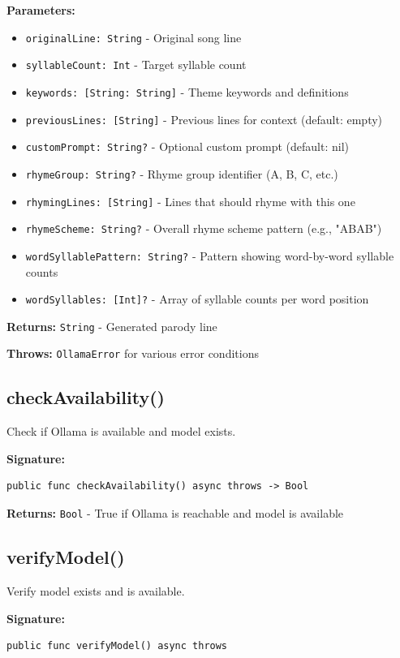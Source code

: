 \documentclass[11pt,a4paper]{article}
\begin{document}
\textbf{Parameters:}
\begin{itemize}
    \item \texttt{originalLine: String} - Original song line
    \item \texttt{syllableCount: Int} - Target syllable count
    \item \texttt{keywords: [String: String]} - Theme keywords and definitions
    \item \texttt{previousLines: [String]} - Previous lines for context (default: empty)
    \item \texttt{customPrompt: String?} - Optional custom prompt (default: nil)
    \item \texttt{rhymeGroup: String?} - Rhyme group identifier (A, B, C, etc.)
    \item \texttt{rhymingLines: [String]} - Lines that should rhyme with this one
    \item \texttt{rhymeScheme: String?} - Overall rhyme scheme pattern (e.g., "ABAB")
    \item \texttt{wordSyllablePattern: String?} - Pattern showing word-by-word syllable counts
    \item \texttt{wordSyllables: [Int]?} - Array of syllable counts per word position
\end{itemize}

\textbf{Returns:} \texttt{String} - Generated parody line

\textbf{Throws:} \texttt{OllamaError} for various error conditions

\subsection{checkAvailability()}

Check if Ollama is available and model exists.

\textbf{Signature:}
\begin{lstlisting}
public func checkAvailability() async throws -> Bool
\end{lstlisting}

\textbf{Returns:} \texttt{Bool} - True if Ollama is reachable and model is available

\subsection{verifyModel()}

Verify model exists and is available.

\textbf{Signature:}
\begin{lstlisting}
public func verifyModel() async throws
\end{lstlisting}
\end{document}
